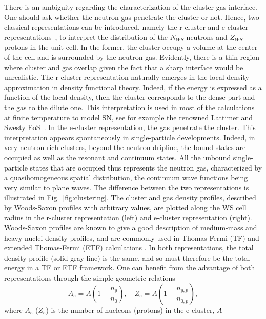 There is an ambiguity regarding the characterization of the cluster-gas
interface. One should ask whether the neutron gas penetrate the cluster or not.
Hence, two classical representations can be introduced, namely the r-cluster and
e-cluster representations~\cite{Papakonstantinou2013}, to interpret the
distribution
of the $N_{WS}$ neutrons and $Z_{WS}$ protons in the unit cell. In the former, the
cluster occupy a volume at the center of the cell and is surrounded
by the neutron gas. Evidently, there is a thin region where cluster and gas
overlap given the fact that a sharp interface would be unrealistic. The
r-cluster representation naturally emerges in the local density approximation
in density functional theory. Indeed, if the energy is expressed as a function
of the local density, then the cluster corresponds to the dense part and the
gas to the dilute one. This interpretation is used in most of the calculations
at finite temperature to model SN, see for example the renowned
Lattimer and Swesty EoS~\cite{Lattimer1991}. In the e-cluster representation,
the gas penetrate the cluster. This interpretation appears spontaneously in
single-particle developments. Indeed, in very neutron-rich clusters, beyond the
neutron dripline, the bound states are occupied as well as the resonant and
continuum states. All the unbound single-particle states that are occupied thus
represents the neutron gas, characterized by a quasihomogeneous spatial 
distribution, the continuum wave functions being very similar to plane waves.
{The difference between the two representations is illustrated in 
Fig.~\ref{fig:clustering}. The cluster and gas density profiles, described by
Woods-Saxon profiles with arbitrary values, are plotted along the WS cell 
radius in the r-cluster representation (left) and e-cluster representation 
(right). Woods-Saxon profiles are known to give a good description of 
medium-mass and heavy nuclei density profiles, and are commonly used in
Thomas-Fermi (TF) and extended Thomas-Fermi (ETF) 
calculations \cite{Onsi2008,Pearson2018}. In both representations, the total
density profile (solid gray line) is the same, and so must therefore be the
total energy in a TF or ETF framework.} 
One can benefit from the advantage of both representations through the simple
geometric relations
%
\begin{equation}
  A_e = A\left(1-\frac{n_g}{n_0}\right), \quad 
  Z_e = A\left(1-\frac{n_{g,p}}{n_{0,p}}\right),
\end{equation}
%
where $A_e$ ($Z_e$) is the number of nucleons (protons) in the e-cluster, $A$
